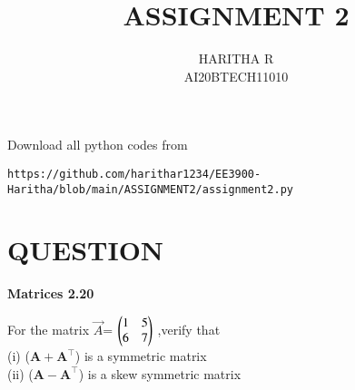 \documentclass[journal,12pt,twocolumn]{IEEEtran}
\begin{document}
\let\vec\mathbf
\renewcommand{\thefigure}{\theproblem}
\def\putbox#1#2#3{\makebox[0in][l]{\makebox[#1][l]{}\raisebox{\baselineskip}[0in][0in]{\raisebox{#2}[0in][0in]{#3}}}}
     \def\rightbox#1{\makebox[0in][r]{#1}}
     \def\centbox#1{\makebox[0in]{#1}}
     \def\topbox#1{\raisebox{-\baselineskip}[0in][0in]{#1}}
     \def\midbox#1{\raisebox{-0.5\baselineskip}[0in][0in]{#1}}
\vspace{3cm}
\title{ ASSIGNMENT 2}
\author{HARITHA R\\ AI20BTECH11010}
\maketitle
\newpage
\bigskip
\renewcommand{\thefigure}{\arabic{figure}}
\renewcommand{\thetable}{\arabic{table}}
Download all python codes from
\begin{lstlisting}
https://github.com/harithar1234/EE3900-Haritha/blob/main/ASSIGNMENT2/assignment2.py
\end{lstlisting}
\section*{QUESTION}
\textbf{Matrices 2.20}
\begin{enumerate}
For the matrix $\Vec{A}$= $\begin{pmatrix}1 & 5\\ 6 & 7\end{pmatrix}$ ,verify that\\
   (i) ($\vec{A}+\vec{A}^\top$)  is a symmetric matrix\\
    (ii) ($\vec{A}-\vec{A}^\top$) is a skew symmetric matrix
\end{enumerate}
\end{document}
